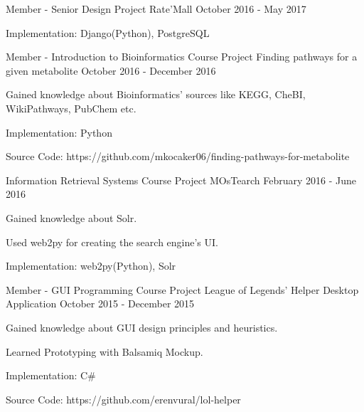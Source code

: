 \begin{cventries}
    \cventry
        {Member - Senior Design Project}
        {Rate'Mall}
        {}
        {October 2016 - May 2017}
        {
            \begin{cvitems}
                \item {Implementation: Django(Python), PostgreSQL}
            \end{cvitems}
        }

    \cventry
        {Member - Introduction to Bioinformatics Course Project}
        {Finding pathways for a given metabolite}
        {}
        {October 2016 - December 2016}
        {
            \begin{cvitems}
                \item {Gained knowledge about Bioinformatics' sources like KEGG, CheBI, WikiPathways, PubChem etc.}
                \item {Implementation: Python}
                \item {Source Code: https://github.com/mkocaker06/finding-pathways-for-metabolite}
            \end{cvitems}
        }

    \cventry
        {Information Retrieval Systems Course Project}
        {MOsTearch}
        {}
        {February 2016 - June 2016}
        {
            \begin{cvitems}
                \item {Gained knowledge about Solr.}
                \item {Used web2py for creating the search engine's UI.}
                \item {Implementation: web2py(Python), Solr}
            \end{cvitems}
        }

    \cventry
        {Member - GUI Programming Course Project}
        {League of Legends' Helper Desktop Application}
        {}
        {October 2015 - December 2015}
        {
            \begin{cvitems}
                \item {Gained knowledge about GUI design principles and heuristics.}
                \item {Learned Prototyping with Balsamiq Mockup.}
                \item {Implementation: C\#}
                \item {Source Code: https://github.com/erenvural/lol-helper}
            \end{cvitems}
        }


\end{cventries}

